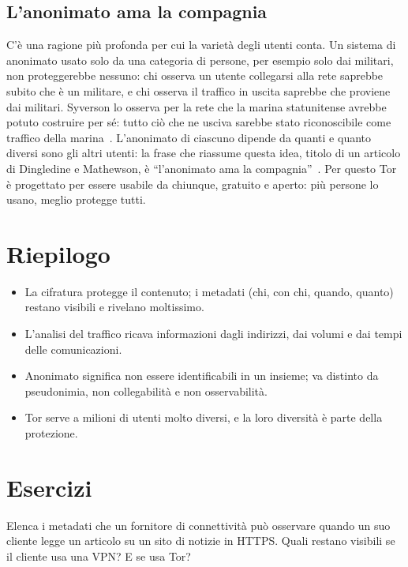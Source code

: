 \subsection{L'anonimato ama la compagnia}

C'è una ragione più profonda per cui la varietà degli utenti conta. Un sistema di anonimato usato solo da una categoria di persone, per esempio solo dai militari, non proteggerebbe nessuno: chi osserva un utente collegarsi alla rete saprebbe subito che è un militare, e chi osserva il traffico in uscita saprebbe che proviene dai militari. Syverson lo osserva per la rete che la marina statunitense avrebbe potuto costruire per sé: tutto ciò che ne usciva sarebbe stato riconoscibile come traffico della marina~\cite{syverson2011peel}. L'anonimato di ciascuno dipende da quanti e quanto diversi sono gli altri utenti: la frase che riassume questa idea, titolo di un articolo di Dingledine e Mathewson, è \enquote{l'anonimato ama la compagnia}~\cite{dingledine2006company}. Per questo Tor è progettato per essere usabile da chiunque, gratuito e aperto: più persone lo usano, meglio protegge tutti.

\section*{Riepilogo}
\begin{itemize}
  \item La cifratura protegge il contenuto; i metadati (chi, con chi, quando, quanto) restano visibili e rivelano moltissimo.
  \item L'analisi del traffico ricava informazioni dagli indirizzi, dai volumi e dai tempi delle comunicazioni.
  \item Anonimato significa non essere identificabili in un insieme; va distinto da pseudonimia, non collegabilità e non osservabilità.
  \item Tor serve a milioni di utenti molto diversi, e la loro diversità è parte della protezione.
\end{itemize}

\section*{Esercizi}

\begin{esercizio}[1]\label{es:01-metadati}
Elenca i metadati che un fornitore di connettività può osservare quando un suo cliente legge un articolo su un sito di notizie in HTTPS. Quali restano visibili se il cliente usa una VPN? E se usa Tor?
\end{esercizio}

